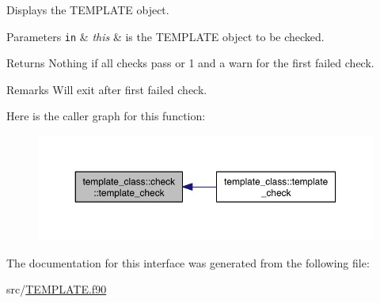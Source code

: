 Displays the T\-E\-M\-P\-L\-A\-T\-E object. 


\begin{DoxyParams}[1]{Parameters}
\mbox{\tt in}  & {\em this} & is the T\-E\-M\-P\-L\-A\-T\-E object to be checked. \\
\hline
\end{DoxyParams}
\begin{DoxyReturn}{Returns}
Nothing if all checks pass or 1 and a warn for the first failed check. 
\end{DoxyReturn}
\begin{DoxyRemark}{Remarks}
Will exit after first failed check. 
\end{DoxyRemark}


Here is the caller graph for this function\-:
\nopagebreak
\begin{figure}[H]
\begin{center}
\leavevmode
\includegraphics[width=350pt]{interfacetemplate__class_1_1check_aad08be82f9ea98602fed47523c5d5fa7_icgraph}
\end{center}
\end{figure}




The documentation for this interface was generated from the following file\-:\begin{DoxyCompactItemize}
\item 
src/\hyperlink{_t_e_m_p_l_a_t_e_8f90}{T\-E\-M\-P\-L\-A\-T\-E.\-f90}\end{DoxyCompactItemize}
